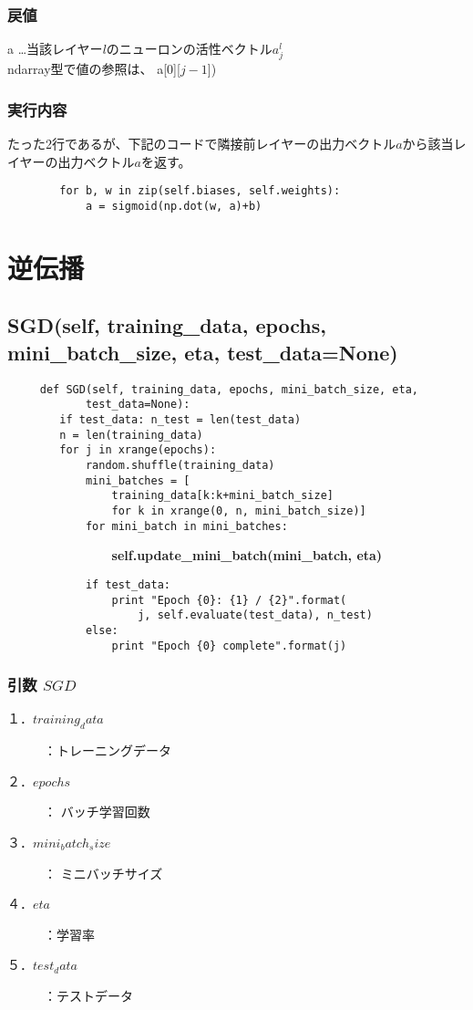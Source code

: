 \documentclass[11pt,a4j,fleqn]{jarticle}
\begin{document}
\subsubsection{戻値}
a …当該レイヤー$l$のニューロンの活性ベクトル$a^l_{j}$\\
ndarray型で値の参照は、  a[0][$j-1$])
\subsubsection{実行内容}
たった2行であるが、下記のコードで隣接前レイヤーの出力ベクトル$a$から該当レイヤーの出力ベクトル$a$を返す。\\
\begin{verbatim}
        for b, w in zip(self.biases, self.weights):
            a = sigmoid(np.dot(w, a)+b)
\end{verbatim}

\section{逆伝播}
\subsection{SGD(self, training\_data, epochs, mini\_batch\_size, eta,
            test\_data=None)}
\begin{verbatim}
     def SGD(self, training_data, epochs, mini_batch_size, eta,
            test_data=None):
        if test_data: n_test = len(test_data)
        n = len(training_data)
        for j in xrange(epochs):
            random.shuffle(training_data)
            mini_batches = [
                training_data[k:k+mini_batch_size]
                for k in xrange(0, n, mini_batch_size)]
            for mini_batch in mini_batches:
\end{verbatim}            
\verb|                |{\Large \bf self.update\_mini\_batch(mini\_batch, eta)}
\begin{verbatim}
            if test_data:
                print "Epoch {0}: {1} / {2}".format(
                    j, self.evaluate(test_data), n_test)
            else:
                print "Epoch {0} complete".format(j)
\end{verbatim}
\subsubsection{引数 $SGD$}
\begin{description}
  \item[１．$training_data$] ：トレーニングデータ
  \item[２．$epochs$] ： バッチ学習回数
  \item[３．$mini_batch_size$] ： ミニバッチサイズ
  \item[４．$eta$] ：学習率
  \item[５．$test_data$]  ：テストデータ
\end{description}
\end{document}
